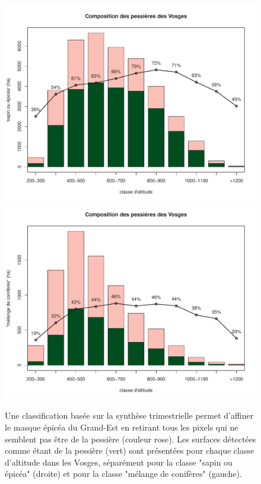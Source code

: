 \documentclass[a4paper, 12pt]{article} %
\begin{document}
\begin{figure}
	\centering
	\includegraphics[width=0.49\linewidth]{compoEPorS.pdf}
	\includegraphics[width=0.49\linewidth]{compoResineux.pdf}
	\caption{Une classification basée sur la synthèse trimestrielle permet d'affiner le masque épicéa du Grand-Est en retirant tous les pixels qui ne semblent pas être de la pessière (couleur rose). Les surfaces détectées comme étant de la pessière (vert) sont présentées pour chaque classe d'altitude dans les Vosges, séparément pour la classe "sapin ou épicéa" (droite) et pour la classe "mélange de conifères" (gauche).}
	\label{fig:reclasEP}
\end{figure}


%


\end{document}
